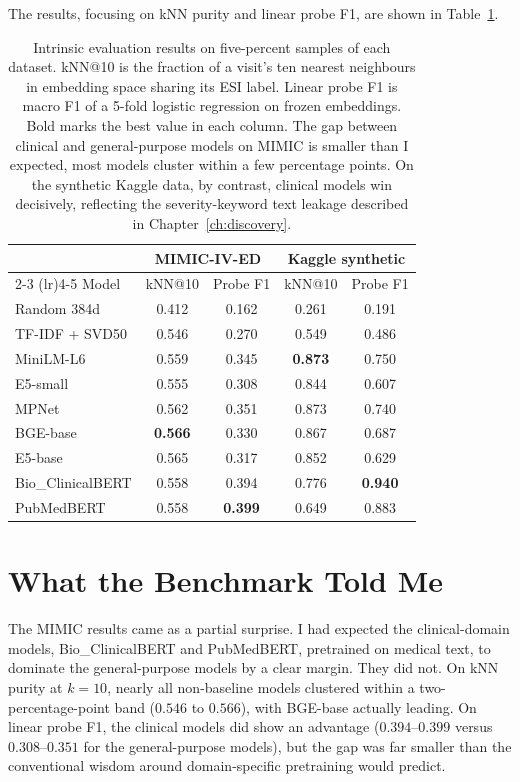 The results, focusing on kNN purity and linear probe F1, are shown in Table~\ref{tab:benchmark-results}.

\begin{table}[htbp]
 \centering
 \caption[Embedding benchmark results on MIMIC-IV-ED and Kaggle]{Intrinsic evaluation results on five-percent samples of each dataset. kNN@10 is the fraction of a visit's ten nearest neighbours in embedding space sharing its ESI label. Linear probe F1 is macro F1 of a 5-fold logistic regression on frozen embeddings. Bold marks the best value in each column. The gap between clinical and general-purpose models on MIMIC is smaller than I expected, most models cluster within a few percentage points. On the synthetic Kaggle data, by contrast, clinical models win decisively, reflecting the severity-keyword text leakage described in Chapter~\ref{ch:discovery}.}
 \label{tab:benchmark-results}
 \small
 \begin{tabular}{lcccc}
 \toprule
 & \multicolumn{2}{c}{MIMIC-IV-ED} & \multicolumn{2}{c}{Kaggle synthetic} \\
 \cmidrule(lr){2-3} \cmidrule(lr){4-5}
 Model & kNN@10 & Probe F1 & kNN@10 & Probe F1 \\
 \midrule
 Random 384d & 0.412 & 0.162 & 0.261 & 0.191 \\
 TF-IDF + SVD50 & 0.546 & 0.270 & 0.549 & 0.486 \\
 MiniLM-L6 & 0.559 & 0.345 & \textbf{0.873} & 0.750 \\
 E5-small & 0.555 & 0.308 & 0.844 & 0.607 \\
 MPNet & 0.562 & 0.351 & 0.873 & 0.740 \\
 BGE-base & \textbf{0.566} & 0.330 & 0.867 & 0.687 \\
 E5-base & 0.565 & 0.317 & 0.852 & 0.629 \\
 Bio\_ClinicalBERT & 0.558 & 0.394 & 0.776 & \textbf{0.940} \\
 PubMedBERT & 0.558 & \textbf{0.399} & 0.649 & 0.883 \\
 \bottomrule
 \end{tabular}
\end{table}

\section{What the Benchmark Told Me}

The MIMIC results came as a partial surprise. I had expected the clinical-domain models, Bio\_ClinicalBERT and PubMedBERT, pretrained on medical text, to dominate the general-purpose models by a clear margin. They did not. On kNN purity at $k=10$, nearly all non-baseline models clustered within a two-percentage-point band ($0.546$ to $0.566$), with BGE-base actually leading. On linear probe F1, the clinical models did show an advantage ($0.394$--$0.399$ versus $0.308$--$0.351$ for the general-purpose models), but the gap was far smaller than the conventional wisdom around domain-specific pretraining would predict.

